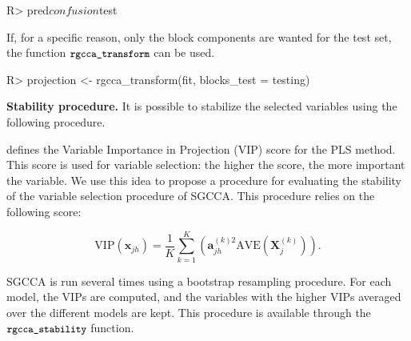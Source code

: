 \documentclass[
]{jss}
\begin{document}
\footnotesize

\begin{CodeChunk}
\begin{CodeInput}
R> pred$confusion$test
\end{CodeInput}
\end{CodeChunk}

\normalsize

If, for a specific reason, only the block components are wanted for the
test set, the function \(\small{\texttt{rgcca\_transform}}\) can be
used.

\footnotesize

\begin{CodeChunk}
\begin{CodeInput}
R> projection <- rgcca_transform(fit, blocks_test = testing)
\end{CodeInput}
\end{CodeChunk}

\normalsize

\textbf{Stability procedure.} It is possible to stabilize the selected
variables using the following procedure.

\cite{Tenenhaus1998} defines the Variable Importance in Projection (VIP)
score for the PLS method. This score is used for variable selection: the
higher the score, the more important the variable. We use this idea to
propose a procedure for evaluating the stability of the variable
selection procedure of SGCCA. This procedure relies on the following
score:

\begin{equation}
\displaystyle \mathrm{VIP}(\mathbf{x}_{jh}) = \frac{1}{K} \sum_{k=1}^K \left(\mathbf{a}_{jh}^{(k)2} \mathrm{AVE}\left(\mathbf X_j^{(k)}\right)\right).
\label{VIP}
\end{equation}

SGCCA is run several times using a bootstrap resampling procedure. For
each model, the VIPs are computed, and the variables with the higher
VIPs averaged over the different models are kept. This procedure is
available through the \(\small{\texttt{rgcca\_stability}}\) function.

\footnotesize

\begin{CodeChunk}
\end{CodeChunk}
\end{document}
